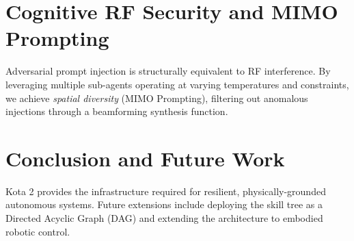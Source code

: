 \documentclass[11pt,a4paper]{article}
\begin{document}
\section{Cognitive RF Security and MIMO Prompting}
Adversarial prompt injection is structurally equivalent to RF interference. By leveraging multiple sub-agents operating at varying temperatures and constraints, we achieve \textit{spatial diversity} (MIMO Prompting), filtering out anomalous injections through a beamforming synthesis function.

\section{Conclusion and Future Work}
Kota 2 provides the infrastructure required for resilient, physically-grounded autonomous systems. Future extensions include deploying the skill tree as a Directed Acyclic Graph (DAG) and extending the architecture to embodied robotic control.
\end{document}
